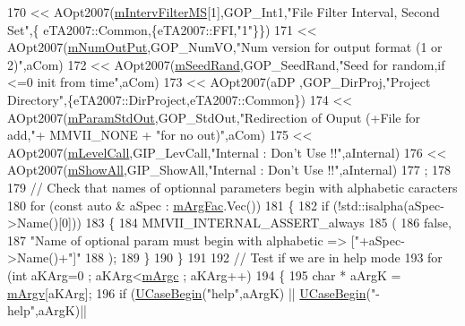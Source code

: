 \begin{DoxyCode}
170       <<  AOpt2007(\hyperlink{classMMVII_1_1cMMVII__Appli_ac3534cd89df89a254e1b58934c79b328}{mIntervFilterMS}[1],GOP\_Int1,\textcolor{stringliteral}{"File Filter Interval, Second Set"},\{
      eTA2007::Common,\{eTA2007::FFI,\textcolor{stringliteral}{"1"}\}\})
171       <<  AOpt2007(\hyperlink{classMMVII_1_1cMMVII__Appli_a55fc539a1cf1434f2ee551143fe55c86}{mNumOutPut},GOP\_NumVO,\textcolor{stringliteral}{"Num version for output format (1 or 2)"},aCom)
172       <<  AOpt2007(\hyperlink{classMMVII_1_1cMMVII__Appli_a52b203a011f0a75f962d690fa45e3803}{mSeedRand},GOP\_SeedRand,\textcolor{stringliteral}{"Seed for random,if <=0 init from time"},aCom)
173       <<  AOpt2007(aDP ,GOP\_DirProj,\textcolor{stringliteral}{"Project Directory"},\{eTA2007::DirProject,eTA2007::Common\})
174       <<  AOpt2007(\hyperlink{classMMVII_1_1cMMVII__Appli_a4271799db9866d8ed5b194e2022633d0}{mParamStdOut},GOP\_StdOut,\textcolor{stringliteral}{"Redirection of Ouput (+File for add,"}+ MMVII\_NONE +
       \textcolor{stringliteral}{"for no out)"},aCom)
175       <<  AOpt2007(\hyperlink{classMMVII_1_1cMMVII__Appli_a5f192b970853c0d1d37ed3426f018cf2}{mLevelCall},GIP\_LevCall,\textcolor{stringliteral}{"Internal : Don't Use !!"},aInternal)
176       <<  AOpt2007(\hyperlink{classMMVII_1_1cMMVII__Appli_ab89b6c52a81c12bbb21abe229906547b}{mShowAll},GIP\_ShowAll,\textcolor{stringliteral}{"Internal : Don't Use !!"},aInternal)
177   ;
178 
179   \textcolor{comment}{// Check that names of optionnal parameters begin with alphabetic caracters}
180   \textcolor{keywordflow}{for} (\textcolor{keyword}{const} \textcolor{keyword}{auto} & aSpec : \hyperlink{classMMVII_1_1cMMVII__Appli_a18ca3cf743bc5d1c3f9250d0302fe25f}{mArgFac}.Vec())
181   \{
182       \textcolor{keywordflow}{if} (!std::isalpha(aSpec->Name()[0]))
183       \{
184          MMVII\_INTERNAL\_ASSERT\_always
185          (
186              \textcolor{keyword}{false},
187              \textcolor{stringliteral}{"Name of optional param must begin with alphabetic => ["}+aSpec->Name()+\textcolor{stringliteral}{"]"}
188          );
189       \}
190   \}
191 
192   \textcolor{comment}{// Test if we are in help mode}
193   \textcolor{keywordflow}{for} (\textcolor{keywordtype}{int} aKArg=0 ; aKArg<\hyperlink{classMMVII_1_1cMMVII__Appli_a6f5d72aa095f192cb6896076e7854bf2}{mArgc} ; aKArg++)
194   \{
195       \textcolor{keywordtype}{char} * aArgK = \hyperlink{classMMVII_1_1cMMVII__Appli_a5dce048e1b8e02d6b27096b9f3ce233e}{mArgv}[aKArg];
196       \textcolor{keywordflow}{if} (\hyperlink{uti__string_8cpp_a595e0d03ab829fd9baf58e036de11e57}{UCaseBegin}(\textcolor{stringliteral}{"help"},aArgK) || \hyperlink{uti__string_8cpp_a595e0d03ab829fd9baf58e036de11e57}{UCaseBegin}(\textcolor{stringliteral}{"-help"},aArgK)|| 

\end{DoxyCode}
